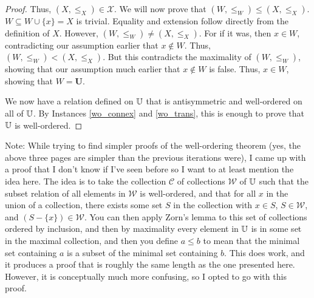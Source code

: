 \documentclass[../math.tex]{subfiles}
\begin{document}
\begin{proof}
    Thus, $(X, \leq_X) \in \mathcal X$.  We will now prove that $(W, \leq_W)
    \leq (X, \leq_X)$.  $W \subseteq W \cup \{x\} = X$ is trivial.  Equality and
    extension follow directly from the definition of $X$.  However, $(W, \leq_W)
    \neq (X, \leq_X)$.  For if it was, then $x \in W$, contradicting our
    assumption earlier that $x \notin W$.  Thus, $(W, \leq_W) < (X, \leq_X)$.
    But this contradicts the maximality of $(W, \leq_W)$, showing that our
    assumption much earlier that $x \notin W$ is false.  Thus, $x \in W$,
    showing that $W = \bm U$.

    We now have a relation defined on $\mathbb{U}$ that is antisymmetric and
    well-ordered on all of $\mathbb{U}$.  By Instances \ref{wo_connex} and
    \ref{wo_trans}, this is enough to prove that $\mathbb{U}$ is well-ordered.
\end{proof}

Note: While trying to find simpler proofs of the well-ordering theorem (yes, the
above three pages are simpler than the previous iterations were), I came up with
a proof that I don't know if I've seen before so I want to at least mention the
idea here.  The idea is to take the collection $\mathcal C$ of collections
$\mathcal W$ of $\mathbb{U}$ such that the subset relation of all elements in $\mathcal
W$ is well-ordered, and that for all $x$ in the union of a collection, there
exists some set $S$ in the collection with $x \in S$, $S \in \mathcal W$, and
$(S - \{x\}) \in \mathcal W$.  You can then apply Zorn's lemma to this set of
collections ordered by inclusion, and then by maximality every element in $\mathbb{U}$
is in some set in the maximal collection, and then you define $a \leq b$ to mean
that the minimal set containing $a$ is a subset of the minimal set containing
$b$.  This does work, and it produces a proof that is roughly the same length as
the one presented here.  However, it is conceptually much more confusing, so I
opted to go with this proof.
\end{document}
